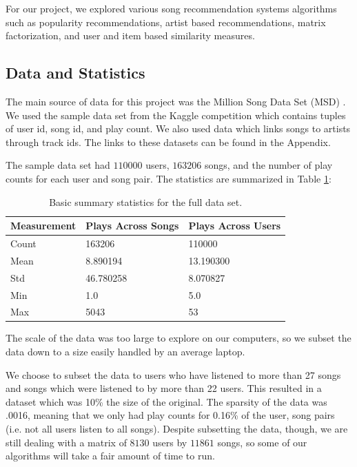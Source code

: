 \documentclass[11pt,preprint]{aastex}
\begin{document}
For our project, we explored various song recommendation systems algorithms such as popularity recommendations, artist based recommendations, matrix factorization, and user and item based similarity measures.  

\subsection{Data and Statistics}
The main source of data for this project was the Million Song Data Set (MSD)  \citep{Bertin-Mahieux2011}. We used the sample data set from the Kaggle competition which contains tuples of user id, song id, and play count. We also used data which links songs to artists through track ids. The links to these datasets can be found in the Appendix.

The sample data set had $110000$ users, $163206$ songs, and the number of play counts for each user and song pair. The statistics are summarized in Table \ref{tab:stats}:

\begin{table}[h]
\begin{center}
\begin{tabular}{lll}
\hline
Measurement & Plays Across Songs & Plays Across Users \\
\hline
Count &  163206 & 110000 \\
Mean  &     8.890194 & 13.190300  \\
Std      &    46.780258 & 8.070827 \\
Min      &    1.0  & 5.0  \\
Max     &   5043 &  53 \\
\end{tabular}
\caption{Basic summary statistics for the full data set.}
\label{tab:stats}
\end{center}
\end{table}

The scale of the data was too large to explore on our computers, so we subset the data down to a size easily handled by an average laptop. 


We choose to subset the data to users who have listened to more than 27 songs and songs which were listened to by more than 22 users. This resulted in a dataset which was 10\% the size of the original. The sparsity of the data was .0016, meaning that we only had play counts for 0.16\% of the user, song pairs (i.e. not all users listen to all songs). Despite subsetting the data, though, we are still dealing with a matrix of $8130$ users by $11861$ songs, so some of our algorithms will take a fair amount of time to run.
\end{document}
